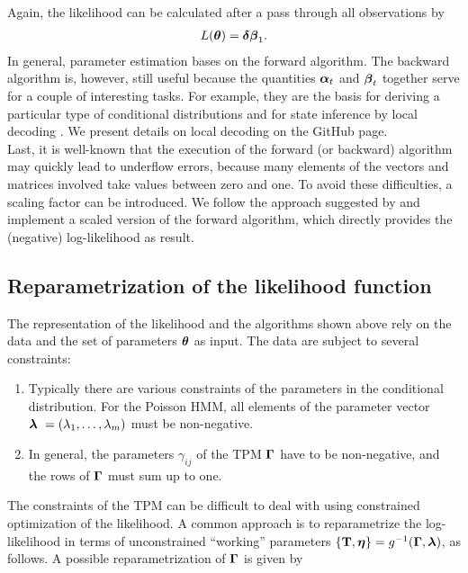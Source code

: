 \documentclass[bimj,fleqn]{w-art}\usepackage[]{graphicx}\usepackage[]{color}
\newcommand{\bct}{{\bf T}}
\newcommand{\bgamma}{\mbox{\boldmath $\Gamma$}}
\newcommand{\bfeta}{\mbox{\boldmath $\eta$}}
\newcommand{\btheta}{\mbox{\boldmath $\theta$}}
\newcommand{\balpha}{\mbox{\boldmath $\alpha$}}
\newcommand{\bfbeta}{\mbox{\boldmath $\beta$}}
\newcommand{\bfdelta}{\mbox{\boldmath $\delta$}}
\newcommand{\bflambda}{\mbox{\boldmath $\lambda$}}
\theoremstyle{plain}
\theoremstyle{definition}
\begin{document}
Again, the likelihood can be calculated after a pass through all observations by
\begin{gather*}
L(\btheta) = \bfdelta \bfbeta_1.
\end{gather*}
In general, parameter estimation bases on the forward algorithm.
The backward algorithm is, however, still useful because the quantities $\balpha_t$ and $\bfbeta_t$ together serve for a couple of interesting tasks.
For example, they are the basis for deriving a particular type of conditional distributions and for state inference by local decoding \cite[Ch.~5, pp.~81-93]{zucchini}. We present details on local decoding on the GitHub page.\\
Last, it is well-known that the execution of the forward (or backward) algorithm may quickly lead to underflow errors, because many elements of the vectors and matrices involved take values between zero and one. To avoid these difficulties, a scaling factor can be introduced. We follow the approach suggested by \citet[p. ~48]{zucchini} and implement a scaled version of the forward algorithm, which directly provides the (negative) log-likelihood as result.


\subsection{Reparametrization of the likelihood function}
\label{sec:hmm_repar}

The representation of the likelihood and the algorithms shown above rely on the data and the set of parameters $\btheta$ as input. The data are subject to several constraints:
\begin{enumerate}
\item Typically there are various constraints of the parameters in the conditional distribution. For the Poisson HMM, all elements of the parameter vector $\bflambda\ = (\lambda_1, \dots, \lambda_m)$ must be non-negative. 
\item In general, the parameters $\gamma_{ij}$ of the TPM $\bgamma$ have to be non-negative, and the rows of $\bgamma$ must sum up to one.
\end{enumerate}
The constraints of the TPM can be difficult to deal with using constrained optimization of the likelihood. A common approach is to reparametrize the log-likelihood in terms of unconstrained ``working'' parameters $\{\bct, \bfeta\}= g^{-1}(\bgamma, \bflambda)$, as follows. A possible reparametrization of $\bgamma$ is given by 
\end{document}
